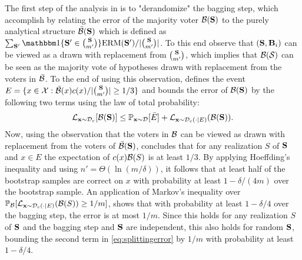 The first step of the analysis in \cite{baggingoptimalPAClearner} is to "derandomize" the bagging step, which \citeauthor{baggingoptimalPAClearner} accomplish by relating the error of the majority voter $\mathcal{B}(\mathbf{S})$ to the purely analytical structure $\bar{\mathcal{B}}(\mathbf{S})$ which is defined as $\sum_{\rS'} \ind\{\rS'\in \binom{\rS}{m'}\}\erm(\rS')/|\tbinom{\rS}{m'}|$. To this end \citeauthor{baggingoptimalPAClearner} observe that $ (\mathbf{S},\mathbf{B}_{i}) $ can be viewed as a drawn with replacement from $\tbinom{\mathbf{S}}{m'}$, which implies that $ \mathcal{B}(\mathcal{S}) $ can be seen as the majority vote of hypotheses drawn with replacement from the voters in $ \bar{\mathcal{B}} $. To the end of using this observation, \citeauthor{baggingoptimalPAClearner} defines the event $E=\{ x\in \mathcal{X}: \bar{\mathcal{B}}(x)c(x)/|\binom{\mathbf{S}}{m'}|\geq 1/3\}$ and bounds the error of $\mathcal{B}(\mathbf{S})  $ by the following two terms using the law of total probability:
\begin{align}\label{eq:splittingerror}
  \vspace{-0.5cm}
 \ls_{\rx\sim\cD_{c}}[\cB(\rS) ] \leq \p_{\rx\sim\cD}[\bar{E}]+\ls_{\rx\sim\cD_{c}(\cdot \mid E)}(\cB(\rS)).
\end{align}
\vspace{-0.5cm}\newline
Now, using the observation that the voters in $ \mathcal{B} $ can be viewed as drawn with replacement from the voters of $ \bar{\mathcal{B}}(\mathbf{S}) $, \citeauthor{baggingoptimalPAClearner} concludes that for any realization $S$ of $\mathbf{S}$ and $x\in E$ the expectation of $c(x)\mathcal{B}(S)$ is at least $1/3$. By applying Hoeffding's inequality and using $ n'=\Theta(\ln{(m/\delta )})$, it follows that at least half of the bootstrap samples are correct on $x$ with probability at least $1-\delta/(4m)$ over the bootstrap sample. An application of Markov's inequality over $\mathbb{P}_{\mathcal{B}}[\operatorname{\mathcal{L}}_{\mathbf{x}\sim\mathcal{D}_{c}(\cdot|E)}(\mathcal{B}(S))\geq 1/m]$, shows that with probability at least $1-\delta/4$ over the bagging step, the error is at most $1/m$. Since this holds for any realization $S$ of $\mathbf{S}$ and the bagging step and $\mathbf{S}$ are independent, this also holds for random $ \mathbf{S} $, bounding the second term in \cref{eq:splittingerror} by $ 1/m $ with probability at least $ 1-\delta/4 $. 

